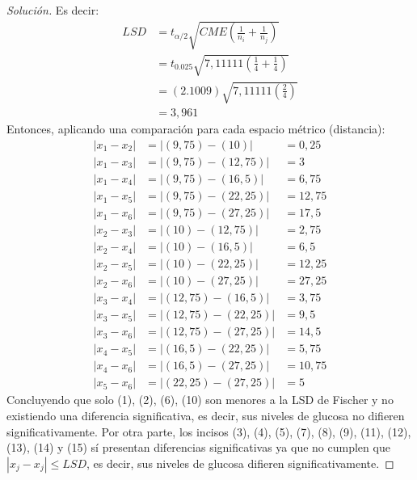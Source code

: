 \documentclass[a4paper,12pt]{article}
\newenvironment{solution}
  {\renewcommand\qedsymbol{$\blacksquare$}\begin{proof}[Solución]}
  {\end{proof}}
\begin{document}
\begin{solution}
Es decir: 
\begin{align}
     LSD &= t_{\alpha/2}\sqrt{CME\left(\frac{1}{n_i}+\frac{1}{n_j}\right)}\\
         &= t_{0.025}\sqrt{7,11111\left(\frac{1}{4}+\frac{1}{4}\right)}\\
         &= (2.1009)\sqrt{7,11111\left(\frac{2}{4}\right)}\\
         &= 3,961
\end{align}
Entonces, aplicando una comparación para cada espacio métrico (distancia): 
\begin{align}
    |x_1-x_2| &= |(9,75)-(10)| &= 0,25\\
    |x_1-x_3| &= |(9,75)-(12,75)| &= 3\\
    |x_1-x_4| &= |(9,75)-(16,5)| &= 6,75\\
    |x_1-x_5| &= |(9,75)-(22,25)| &= 12,75\\
    |x_1-x_6| &= |(9,75)-(27,25)| &= 17,5\\
    |x_2-x_3| &= |(10)-(12,75)| &= 2,75\\
    |x_2-x_4| &= |(10)-(16,5)| &= 6,5\\
    |x_2-x_5| &= |(10)-(22,25)| &=12,25\\
    |x_2-x_6| &= |(10)-(27,25)| &=27,25\\
    |x_3-x_4| &= |(12,75)-(16,5)| &=3,75\\
    |x_3-x_5| &= |(12,75)-(22,25)| &= 9,5\\
    |x_3-x_6| &= |(12,75)-(27,25)| &=14,5\\
    |x_4-x_5| &= |(16,5)-(22,25)| &=5,75\\
    |x_4-x_6| &= |(16,5)-(27,25)| &= 10,75\\
    |x_5-x_6| &= |(22,25)-(27,25)| &=5
\end{align}
Concluyendo que solo (1), (2), (6), (10) son menores a la LSD de Fischer y no existiendo una diferencia significativa, es decir, sus niveles de glucosa no difieren significativamente. Por otra parte, los incisos (3), (4), (5), (7), (8), (9), (11), (12), (13), (14) y (15) sí presentan diferencias significativas ya que no cumplen que $|x_j-x_j|\leq LSD$, es decir, sus niveles de glucosa difieren significativamente.
\end{solution}
\end{document}
